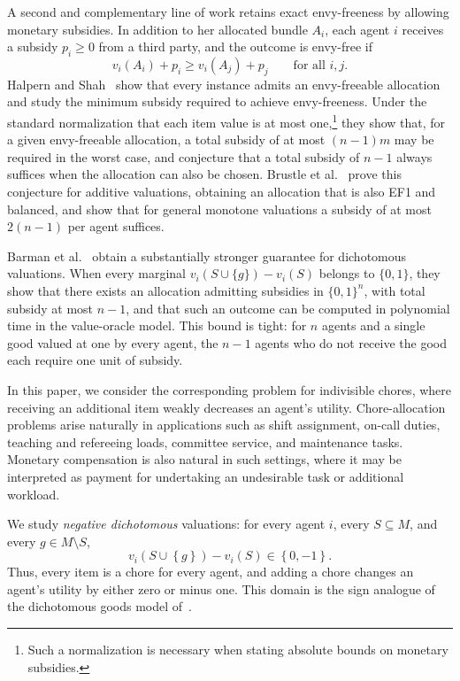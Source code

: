 \documentclass[11pt]{article}
\theoremstyle{plain}
\theoremstyle{plain}
\newcommand{\items}{M}                        %
\newcommand{\set}[1]{\left\{#1\right\}}
\begin{document}
A second and complementary line of work retains exact envy-freeness by allowing monetary subsidies. In addition to her allocated bundle $A_i$, each agent $i$ receives a subsidy $p_i\geq 0$ from a third party, and the outcome is envy-free if
\[v_i(A_i)+p_i \geq v_i(A_j)+p_j
    \qquad\text{for all }i,j.\]
Halpern and Shah~\cite{HS19} show that every instance admits an envy-freeable allocation and study the minimum subsidy required to achieve envy-freeness. Under the standard normalization that each item value is at most one,\footnote{Such a normalization is necessary when stating absolute bounds on monetary subsidies.} they show that, for a given envy-freeable allocation, a total subsidy of at most $(n-1)m$ may be required in the worst case, and conjecture that a total subsidy of $n-1$ always suffices when the allocation can also be chosen. Brustle et al.~\cite{BDNSV20} prove this conjecture for additive valuations, obtaining an allocation that is also EF1 and balanced, and show that for general monotone valuations a subsidy of at most $2(n-1)$ per agent suffices.

Barman et al.~\cite{BKNS22} obtain a substantially stronger guarantee for dichotomous valuations. When every marginal $v_i(S\cup\{g\})-v_i(S)$ belongs to $\{0,1\}$, they show that there exists an allocation admitting subsidies in $\{0,1\}^n$, with total subsidy at most $n-1$, and that such an outcome can be computed in polynomial time in the value-oracle model. This bound is tight: for $n$ agents and a single good valued at one by every agent, the $n-1$ agents who do not receive the good each require one unit of subsidy.

In this paper, we consider the corresponding problem for indivisible chores, where receiving an additional item weakly decreases an agent's utility. Chore-allocation problems arise naturally in applications such as shift assignment, on-call duties, teaching and refereeing loads, committee service, and maintenance tasks. Monetary compensation is also natural in such settings, where it may be interpreted as payment for undertaking an undesirable task or additional workload.

We study \emph{negative dichotomous} valuations: for every agent $i$, every $S\subseteq \items$, and every $g\in \items\setminus S$, \[ v_i(S\cup\set{g})-v_i(S)\in\set{0,-1}. \] Thus, every item is a chore for every agent, and adding a chore changes an agent's utility by either zero or minus one. This domain is the sign analogue of the dichotomous goods model of~\cite{BKNS22}.
\end{document}

